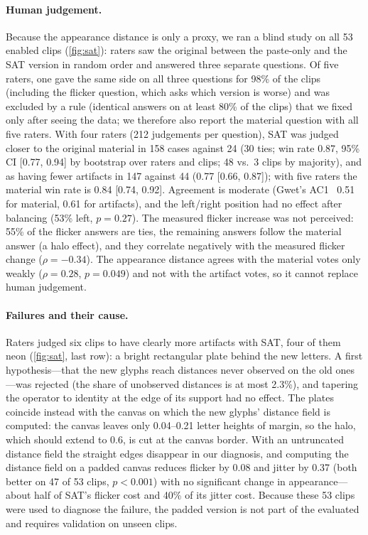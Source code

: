 \paragraph{Human judgement.} Because the appearance distance is only a proxy, we ran a blind study on all 53 enabled clips (\cref{fig:sat}): raters saw the original between the paste-only and the SAT version in random order and answered three separate questions. Of five raters, one gave the same side on all three questions for 98\% of the clips (including the flicker question, which asks which version is worse) and was excluded by a rule (identical answers on at least 80\% of the clips) that we fixed only after seeing the data; we therefore also report the material question with all five raters. With four raters (212 judgements per question), SAT was judged closer to the original material in 158 cases against 24 (30 ties; win rate 0.87, 95\% CI [0.77, 0.94] by bootstrap over raters and clips; 48 vs.\ 3 clips by majority), and as having fewer artifacts in 147 against 44 (0.77 [0.66, 0.87]); with five raters the material win rate is 0.84 [0.74, 0.92]. Agreement is moderate (Gwet's AC1~\cite{gwet2008ac1} 0.51 for material, 0.61 for artifacts), and the left/right position had no effect after balancing (53\% left, $p=0.27$). The measured flicker increase was not perceived: 55\% of the flicker answers are ties, the remaining answers follow the material answer (a halo effect), and they correlate negatively with the measured flicker change ($\rho=-0.34$). The appearance distance agrees with the material votes only weakly ($\rho=0.28$, $p=0.049$) and not with the artifact votes, so it cannot replace human judgement.

\paragraph{Failures and their cause.} Raters judged six clips to have clearly more artifacts with SAT, four of them neon (\cref{fig:sat}, last row): a bright rectangular plate behind the new letters. A first hypothesis---that the new glyphs reach distances never observed on the old ones---was rejected (the share of unobserved distances is at most 2.3\%), and tapering the operator to identity at the edge of its support had no effect. The plates coincide instead with the canvas on which the new glyphs' distance field is computed: the canvas leaves only 0.04--0.21 letter heights of margin, so the halo, which should extend to 0.6, is cut at the canvas border. With an untruncated distance field the straight edges disappear in our diagnosis, and computing the distance field on a padded canvas reduces flicker by 0.08 and jitter by 0.37 (both better on 47 of 53 clips, $p<0.001$) with no significant change in appearance---about half of SAT's flicker cost and 40\% of its jitter cost. Because these 53 clips were used to diagnose the failure, the padded version is not part of the evaluated \method and requires validation on unseen clips.
